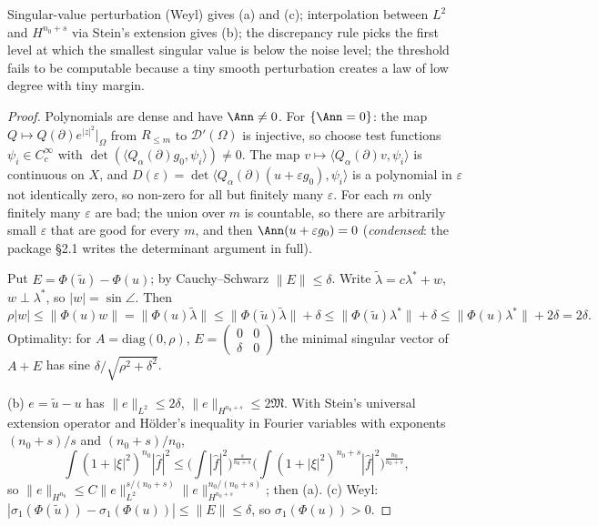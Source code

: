 \begin{proofidea}
Singular-value perturbation (Weyl) gives (a) and (c); interpolation between $L^2$ and $H^{n_0+s}$ via Stein's extension gives (b); the discrepancy rule picks the first level at which the smallest singular value is below the noise level; the threshold fails to be computable because a tiny smooth perturbation creates a law of low degree with tiny margin.
\end{proofidea}

\begin{proof}
Polynomials are dense and have $\Ann\ne0$. For $\{\Ann=0\}$: the map $Q\mapsto Q(\partial)e^{|z|^2}|_\Omega$ from $R_{\le m}$ to $\mathcal D'(\Omega)$ is injective, so choose test functions $\psi_i\in C_c^\infty$ with $\det(\langle Q_\alpha(\partial)g_0,\psi_i\rangle)\ne0$. The map $v\mapsto\langle Q_\alpha(\partial)v,\psi_i\rangle$ is continuous on $X$, and $D(\varepsilon)=\det\langle Q_\alpha(\partial)(u+\varepsilon g_0),\psi_i\rangle$ is a polynomial in $\varepsilon$ not identically zero, so non-zero for all but finitely many $\varepsilon$. For each $m$ only finitely many $\varepsilon$ are bad; the union over $m$ is countable, so there are arbitrarily small $\varepsilon$ that are good for every $m$, and then $\Ann(u+\varepsilon g_0)=0$ (\emph{condensed}: the package \S2.1 writes the determinant argument in full).

Put $E=\Phi(\tilde u)-\Phi(u)$; by Cauchy--Schwarz $\|E\|\le\delta$. Write $\tilde\lambda=c\lambda^*+w$, $w\perp\lambda^*$, so $|w|=\sin\angle$. Then
\[
\rho|w|\le\|\Phi(u)w\|=\|\Phi(u)\tilde\lambda\|\le\|\Phi(\tilde u)\tilde\lambda\|+\delta\le\|\Phi(\tilde u)\lambda^*\|+\delta\le\|\Phi(u)\lambda^*\|+2\delta=2\delta .
\]
Optimality: for $A=\mathrm{diag}(0,\rho)$, $E=\begin{pmatrix}0&0\\\delta&0\end{pmatrix}$ the minimal singular vector of $A+E$ has sine $\delta/\sqrt{\rho^2+\delta^2}$.

(b) $e=\tilde u-u$ has $\|e\|_{L^2}\le2\delta$, $\|e\|_{H^{n_0+s}}\le2\mathfrak M$. With Stein's universal extension operator and H\"older's inequality in Fourier variables with exponents $(n_0+s)/s$ and $(n_0+s)/n_0$,
\[
\int(1+|\xi|^2)^{n_0}|\hat f|^2\le\Big(\int|\hat f|^2\Big)^{\frac s{n_0+s}}\Big(\int(1+|\xi|^2)^{n_0+s}|\hat f|^2\Big)^{\frac{n_0}{n_0+s}},
\]
so $\|e\|_{H^{n_0}}\le C\|e\|_{L^2}^{s/(n_0+s)}\|e\|_{H^{n_0+s}}^{n_0/(n_0+s)}$; then (a). (c) Weyl: $|\sigma_1(\Phi(\tilde u))-\sigma_1(\Phi(u))|\le\|E\|\le\delta$, so $\sigma_1(\Phi(u))>0$.


\end{proof}

